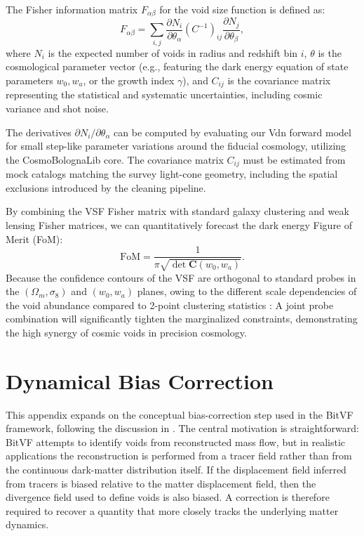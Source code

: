 \documentclass[12pt]{report}
\begin{document}
The Fisher information matrix $F_{\alpha\beta}$ for the void size function is defined as:
\begin{equation}
    F_{\alpha\beta} = \sum_{i,j} \frac{\partial N_i}{\partial \theta_\alpha} (C^{-1})_{ij} \frac{\partial N_j}{\partial \theta_\beta}
    \label{eq:fisher_matrix},
\end{equation}
where $N_i$ is the expected number of voids in radius and redshift bin $i$, $\theta$ is the cosmological parameter vector (e.g., featuring the dark energy equation of state parameters $w_0, w_a$, or the growth index $\gamma$), and $C_{ij}$ is the covariance matrix representing the statistical and systematic uncertainties, including cosmic variance and shot noise.

The derivatives $\partial N_i / \partial \theta_\alpha$ can be computed by evaluating our Vdn forward model for small step-like parameter variations around the fiducial cosmology, utilizing the CosmoBolognaLib core. The covariance matrix $C_{ij}$ must be estimated from mock catalogs matching the survey light-cone geometry, including the spatial exclusions introduced by the cleaning pipeline.

By combining the VSF Fisher matrix with standard galaxy clustering and weak lensing Fisher matrices, we can quantitatively forecast the dark energy Figure of Merit (FoM):
\begin{equation}
    \mathrm{FoM} = \frac{1}{\pi \sqrt{\det \mathbf{C}(w_0, w_a)}}
    \label{eq:fom}.
\end{equation}
Because the confidence contours of the VSF are orthogonal to standard probes in the $(\Omega_m, \sigma_8)$ and $(w_0, w_a)$ planes, owing to the different scale dependencies of the void abundance compared to 2-point clustering statistics \citep{Contarini2022a}: A joint probe combination will significantly tighten the marginalized constraints, demonstrating the high synergy of cosmic voids in precision cosmology.

\clearpage
\appendix

\chapter{Dynamical Bias Correction}
\label{app:bias_correction}

This appendix expands on the conceptual bias-correction step used in the BitVF framework, following the discussion in \citet{Sartori2025}. The central motivation is straightforward: BitVF attempts to identify voids from reconstructed mass flow, but in realistic applications the reconstruction is performed from a tracer field rather than from the continuous dark-matter distribution itself. If the displacement field inferred from tracers is biased relative to the matter displacement field, then the divergence field used to define voids is also biased. A correction is therefore required to recover a quantity that more closely tracks the underlying matter dynamics.
\end{document}
